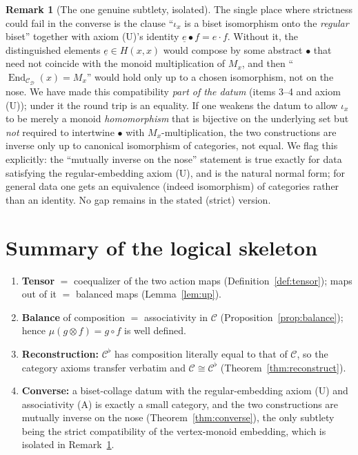 \documentclass[11pt]{article}
\theoremstyle{definition}
\newtheorem{remark}[theorem]{Remark}
\newcommand{\End}{\operatorname{End}}
\newcommand{\C}{\mathcal{C}}
\newcommand{\D}{\mathcal{D}}
\begin{document}
\begin{remark}[The one genuine subtlety, isolated]\label{rem:subtle}
The single place where strictness could fail in the converse is the clause
``$\iota_x$ is a biset isomorphism onto the \emph{regular} biset'' together with
axiom (U)'s identity $\underline e\bullet f=e\cdot f$. Without it, the
distinguished elements $\underline e\in H(x,x)$ would compose by some abstract
$\bullet$ that need not coincide with the monoid multiplication of $M_x$, and
then ``$\End_{\C_\D}(x)=M_x$'' would hold only up to a chosen isomorphism, not
on the nose. We have made this compatibility \emph{part of the datum}
(items 3--4 and axiom (U)); under it the round trip is an equality. If one
weakens the datum to allow $\iota_x$ to be merely a monoid \emph{homomorphism}
that is bijective on the underlying set but \emph{not} required to intertwine
$\bullet$ with $M_x$-multiplication, the two constructions are inverse only up
to canonical isomorphism of categories, not equal. We flag this explicitly: the
``mutually inverse on the nose'' statement is true exactly for data satisfying
the regular-embedding axiom (U), and is the natural normal form; for general
data one gets an equivalence (indeed isomorphism) of categories rather than an
identity. No gap remains in the stated (strict) version.
\end{remark}

\section{Summary of the logical skeleton}

\begin{enumerate}
\item \textbf{Tensor} $=$ coequalizer of the two action maps
(Definition~\ref{def:tensor}); maps out of it $=$ balanced maps
(Lemma~\ref{lem:up}).
\item \textbf{Balance} of composition $=$ associativity in $\C$
(Proposition~\ref{prop:balance}); hence $\mu(g\otimes f)=g\circ f$ is
well defined.
\item \textbf{Reconstruction:} $\C^{\flat}$ has composition literally equal to
that of $\C$, so the category axioms transfer verbatim and
$\C\cong\C^{\flat}$ (Theorem~\ref{thm:reconstruct}).
\item \textbf{Converse:} a biset-collage datum with the regular-embedding
axiom (U) and associativity (A) is exactly a small category, and the two
constructions are mutually inverse on the nose
(Theorem~\ref{thm:converse}), the only subtlety being the strict
compatibility of the vertex-monoid embedding, which is isolated in
Remark~\ref{rem:subtle}.
\end{enumerate}
\end{document}
